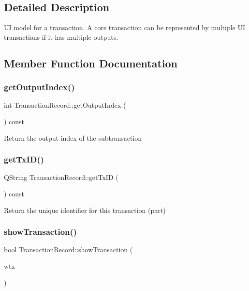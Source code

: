 \subsection{Detailed Description}
UI model for a transaction. A core transaction can be represented by multiple UI transactions if it has multiple outputs. 

\subsection{Member Function Documentation}
\mbox{\label{class_transaction_record_a51d9d52d92a57448ab9b237e968c5ff6}} 
\subsubsection{\texorpdfstring{get\+Output\+Index()}{getOutputIndex()}}
{\footnotesize\ttfamily int Transaction\+Record\+::get\+Output\+Index (\begin{DoxyParamCaption}{ }\end{DoxyParamCaption}) const}

Return the output index of the subtransaction \mbox{\label{class_transaction_record_a838d881f68f967b751e7f7707bccfffa}} 
\subsubsection{\texorpdfstring{get\+Tx\+I\+D()}{getTxID()}}
{\footnotesize\ttfamily Q\+String Transaction\+Record\+::get\+Tx\+ID (\begin{DoxyParamCaption}{ }\end{DoxyParamCaption}) const}

Return the unique identifier for this transaction (part) \mbox{\label{class_transaction_record_a5ad1d1af4bec5b15a624b7a451e8cdbf}} 
\subsubsection{\texorpdfstring{show\+Transaction()}{showTransaction()}}
{\footnotesize\ttfamily bool Transaction\+Record\+::show\+Transaction (\begin{DoxyParamCaption}\item[{const \mbox{\hyperlink{class_c_wallet_tx}{C\+Wallet\+Tx}} \&}]{wtx }\end{DoxyParamCaption})\hspace{0.3cm}{\ttfamily [static]}}

